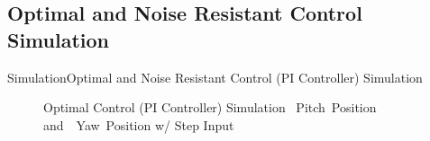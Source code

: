 \documentclass{beamer}
\begin{document}
\subsection{Optimal and Noise Resistant Control Simulation}
\begin{frame}{Simulation}{Optimal and Noise Resistant Control (PI Controller) Simulation}
    \begin{figure}
      \centering
      \caption{Optimal Control (PI Controller) Simulation ~Pitch~Position and~~Yaw~Position w/ Step Input}
      \label{fig:LQR_LQG_Sim_pos}
    \end{figure}
\end{frame}
\end{document}
